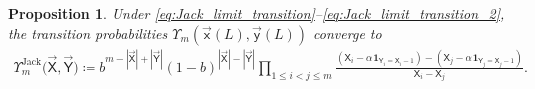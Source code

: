 \documentclass[pdftex]{sigma}
\numberwithin{equation}{section}
\newtheorem{Proposition}[Theorem]{Proposition}
{ \theoremstyle{definition}
\newtheorem{Definition}[Theorem]{Definition}}
\begin{document}
\begin{Proposition}	\label{prop:Jack_degeneration}
	Under
	\eqref{eq:Jack_limit_transition}--\eqref{eq:Jack_limit_transition_2},
	the transition probabilities
	$\Upsilon_m(\vec{\mathsf{x}}(L),\vec{\mathsf{y}}(L))$
	converge to
	\begin{gather}
		\label{eq:Upsilon_Jack}
		\Upsilon_m^{\mathrm{Jack}}\big(\vec{\mathsf{X}},\vec{\mathsf{Y}}\big)
		\coloneqq
		b^{m-|\vec {\mathsf{X}}|+|\vec {\mathsf{Y}}|}
		(1-b)^{|\vec {\mathsf{X}}|-|\vec {\mathsf{Y}}|}
		\!\prod_{1\le i<j\le m}\!
		\frac{(\mathsf{X}_i - \alpha \hspace{1pt} \mathbf{1}_{\mathsf{Y}_i=\mathsf{X}_i-1})
		-(\mathsf{X}_j-\alpha \hspace{1pt} \mathbf{1}_{\mathsf{Y}_j=\mathsf{X}_j-1})}
		{\mathsf{X}_i-\mathsf{X}_j}.\!\!\!
	\end{gather}
\end{Proposition}
\end{document}
